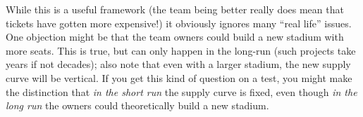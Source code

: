 \documentclass[12pt]{article}
\begin{document}
\medskip

While this is a useful framework (the team being better really does mean that tickets have gotten more expensive!) it obviously ignores many ``real life'' issues. One objection might be that the team owners could build a new stadium with more seats. This is true, but can only happen in the long-run (such projects take years if not decades); also note that even with a larger stadium, the new supply curve will be vertical. If you get this kind of question on a test, you might make the distinction that \textit{in the short run} the supply curve is fixed, even though \textit{in the long run} the owners could theoretically build a new stadium.
\end{document}
